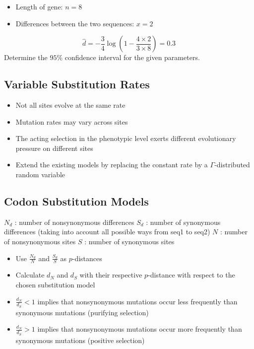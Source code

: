\documentclass{article}
\begin{document}
\begin{multicols*}{3}
\begin{itemize}
    \item Length of gene: $n = 8$
    \item Differences between the two sequences: $x = 2$
\end{itemize}

$$\hat{d} = -\frac{3}{4}\log\left(1-\frac{4\times 2}{3\times 8}\right) = 0.3$$
Determine the $95 \%$ confidence interval for the given parameters. 

\subsection{Variable Substitution Rates}

\begin{itemize}
    \item Not all sites evolve at the same rate
    \item Mutation rates may vary across sites \item The acting selection in the phenotypic level exerts different evolutionary pressure on different sites
    \item Extend the existing models by replacing the constant rate by a $\Gamma$-distributed random variable
\end{itemize}

\subsection{Codon Substitution Models}
$N_d$ : number of nonsynonymous differences \newline
$S_d$ : number of synonymous differences (taking into account all possible ways from seq1 to seq2)
\newline
$N$ : number of nonsynonymous sites
\newline
$S$ : number of synonymous sites
\begin{itemize}
    \item Use $\frac{N_d}{N}$ and $\frac{S_d}{S}$ as $p$-distances
    \item Calculate $d_N$ and $d_S$ with their respective $p$-distance with respect to the chosen substitution model
    \item $\frac{d_N}{d_S}<1$ implies that nonsynonymous mutations occur less frequently than synonymous mutations (purifying selection)
    \item $\frac{d_N}{d_S}>1$ implies that nonsynonymous mutations occur more frequently than synonymous mutations (positive selection)
\end{itemize}

\end{multicols*}
\end{document}
